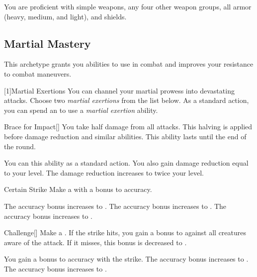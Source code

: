         You are proficient with simple weapons, any four other weapon groups, all armor (heavy, medium, and light), and shields.

    \subsection{Martial Mastery}
        This archetype grants you abilities to use in combat and improves your resistance to combat maneuvers.

        [1]{Martial Exertions}
        You can channel your martial prowess into devastating attacks.
        Choose two \textit{martial exertions} from the list below.
        As a standard action, you can spend an  to use a \textit{martial exertion} ability.
        {
            \begin{ability}{Brace for Impact}[]
                You take half damage from all attacks.
                This halving is applied before damage reduction and similar abilities.
                This ability lasts until the end of the round.

                \rankline
                 You can  this ability as a standard action.
                 You also gain damage reduction equal to your level.
                 The damage reduction increases to twice your level.
            \end{ability}

            \begin{ability}{Certain Strike}
                Make a  with a  bonus to accuracy.

                \rankline
                 The accuracy bonus increases to .
                 The accuracy bonus increases to .
                 The accuracy bonus increases to .
            \end{ability}

            \begin{ability}{Challenge}[]
                Make a .
                If the strike hits, you gain a  bonus to  against all creatures aware of the attack.
                If it misses, this bonus is decreased to .

                \rankline
                 You gain a  bonus to accuracy with the strike.
                 The accuracy bonus increases to .
                 The accuracy bonus increases to .
            \end{ability}

}
